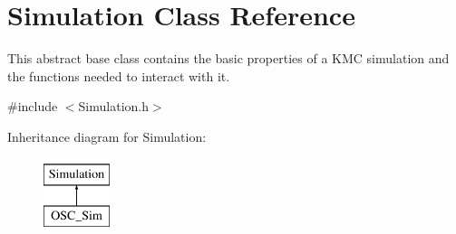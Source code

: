 \hypertarget{class_simulation}{}\section{Simulation Class Reference}
\label{class_simulation}


This abstract base class contains the basic properties of a K\+MC simulation and the functions needed to interact with it.  




{\ttfamily \#include $<$Simulation.\+h$>$}

Inheritance diagram for Simulation\+:\begin{figure}[H]
\begin{center}
\leavevmode
\includegraphics[height=2.000000cm]{class_simulation}
\end{center}
\end{figure}
